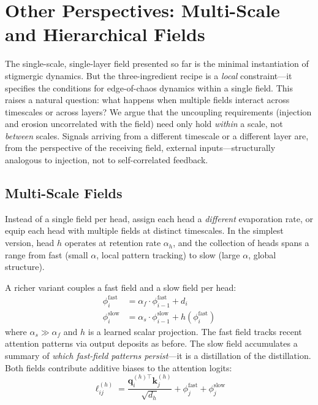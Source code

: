 \documentclass[11pt,a4paper]{article}
\newcommand{\retain}{\alpha}
\newcommand{\q}{\bm{q}}
\newcommand{\K}{\bm{k}}
\begin{document}
\section{Other Perspectives: Multi-Scale and Hierarchical Fields}
\label{sec:perspectives}

The single-scale, single-layer field presented so far is the minimal
instantiation of stigmergic dynamics.  But the three-ingredient
recipe is a \emph{local} constraint---it specifies the conditions for
edge-of-chaos dynamics within a single field.  This raises a natural
question: what happens when multiple fields interact across timescales
or across layers?  We argue that the uncoupling requirements
(injection and erosion uncorrelated with the field) need only hold
\emph{within} a scale, not \emph{between} scales.  Signals arriving
from a different timescale or a different layer are, from the
perspective of the receiving field, external inputs---structurally
analogous to injection, not to self-correlated feedback.

\subsection{Multi-Scale Fields}
\label{sec:multiscale}

Instead of a single field per head, assign each head a
\emph{different} evaporation rate, or equip each head with multiple
fields at distinct timescales.  In the simplest version, head $h$
operates at retention rate $\retain_h$, and the collection of heads
spans a range from fast (small $\retain$, local pattern tracking)
to slow (large $\retain$, global structure).

A richer variant couples a fast field and a slow field per head:
\begin{align}
    \phi_i^{\text{fast}} &= \retain_f \cdot \phi_{i-1}^{\text{fast}} + d_i
    \label{eq:fast_field} \\
    \phi_i^{\text{slow}} &= \retain_s \cdot \phi_{i-1}^{\text{slow}} + h(\phi_i^{\text{fast}})
    \label{eq:slow_field}
\end{align}
where $\retain_s \gg \retain_f$ and $h$ is a learned scalar
projection.  The fast field tracks recent attention patterns via
output deposits as before.  The slow field accumulates a summary of
\emph{which fast-field patterns persist}---it is a distillation of
the distillation.  Both fields contribute additive biases to the
attention logits:
\begin{equation}
    \ell_{ij}^{(h)} = \frac{\q_i^{(h)\top} \K_j^{(h)}}{\sqrt{d_h}}
    + \phi_j^{\text{fast}} + \phi_j^{\text{slow}}
    \label{eq:multiscale_logit}
\end{equation}
\end{document}
